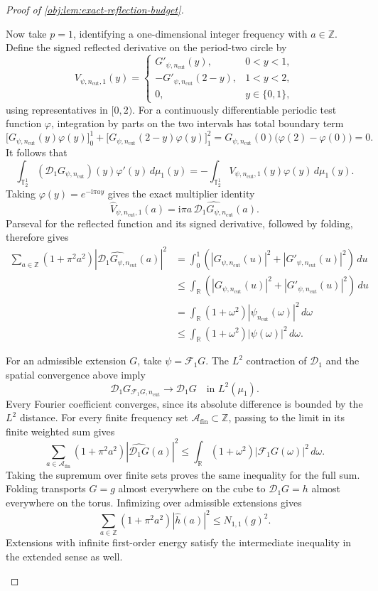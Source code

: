 \begin{proof}[Proof of \cref{obj:lem:exact-reflection-budget}]
\begin{enumerate}
Now take \(p=1\), identifying a one-dimensional integer frequency with \(a\in\mathbb Z\). Define the signed reflected derivative on the period-two circle by
\[
V_{\psi,n_{\mathrm{cut}},1}(y)
=
\begin{cases}
G'_{\psi,n_{\mathrm{cut}}}(y),&0<y<1,\\
-G'_{\psi,n_{\mathrm{cut}}}(2-y),&1<y<2,\\
0,&y\in\{0,1\},
\end{cases}
\]
using representatives in \([0,2)\). For a continuously differentiable periodic test function \(\varphi\), integration by parts on the two intervals has total boundary term
\[
\bigl[G_{\psi,n_{\mathrm{cut}}}(y)\varphi(y)\bigr]_0^1
+
\bigl[G_{\psi,n_{\mathrm{cut}}}(2-y)\varphi(y)\bigr]_1^2
=
G_{\psi,n_{\mathrm{cut}}}(0)\bigl(\varphi(2)-\varphi(0)\bigr)
=
0.
\]
It follows that
\[
\int_{\mathbb T_2^1}
(\mathscr D_1G_{\psi,n_{\mathrm{cut}}})(y)\varphi'(y)\,d\mu_1(y)
=
-\int_{\mathbb T_2^1}
V_{\psi,n_{\mathrm{cut}},1}(y)\varphi(y)\,d\mu_1(y).
\]
Taking \(\varphi(y)=e^{-\mathrm i\pi ay}\) gives the exact multiplier identity
\[
\widehat V_{\psi,n_{\mathrm{cut}},1}(a)
=
\mathrm i\pi a\,
\widehat{\mathscr D_1G_{\psi,n_{\mathrm{cut}}}}(a).
\]
Parseval for the reflected function and its signed derivative, followed by folding, therefore gives
\[
\begin{aligned}
\sum_{a\in\mathbb Z}(1+\pi^2a^2)
\left|\widehat{\mathscr D_1G_{\psi,n_{\mathrm{cut}}}}(a)\right|^2
&=
\int_0^1
\left(
|G_{\psi,n_{\mathrm{cut}}}(u)|^2+
|G'_{\psi,n_{\mathrm{cut}}}(u)|^2
\right)\,du\\
&\leq
\int_{\mathbb R}
\left(
|G_{\psi,n_{\mathrm{cut}}}(u)|^2+
|G'_{\psi,n_{\mathrm{cut}}}(u)|^2
\right)\,du\\
&=
\int_{\mathbb R}(1+\omega^2)
|\psi_{n_{\mathrm{cut}}}(\omega)|^2\,d\omega\\
&\leq
\int_{\mathbb R}(1+\omega^2)|\psi(\omega)|^2\,d\omega.
\end{aligned}
\]

For an admissible extension \(G\), take \(\psi=\mathcal F_1G\).
The \(L^2\) contraction of \(\mathscr D_1\) and the spatial convergence above imply
\[
\mathscr D_1G_{\mathcal F_1G,n_{\mathrm{cut}}}
\longrightarrow\mathscr D_1G
\quad\text{in }L^2(\mu_1).
\]
Every Fourier coefficient converges, since its absolute difference is bounded by the \(L^2\) distance. For every finite frequency set \(\mathcal A_{\mathrm{fin}}\subset\mathbb Z\), passing to the limit in its finite weighted sum gives
\[
\sum_{a\in\mathcal A_{\mathrm{fin}}}(1+\pi^2a^2)
|\widehat{\mathscr D_1G}(a)|^2
\leq
\int_{\mathbb R}(1+\omega^2)|\mathcal F_1G(\omega)|^2\,d\omega.
\]
Taking the supremum over finite sets proves the same inequality for the full sum. Folding transports \(G=g\) almost everywhere on the cube to
\(\mathscr D_1G=h\) almost everywhere on the torus. Infimizing over admissible extensions gives
\[
\sum_{a\in\mathbb Z}(1+\pi^2a^2)|\widehat h(a)|^2
\leq N_{1,1}(g)^2.
\]
Extensions with infinite first-order energy satisfy the intermediate inequality in the extended sense as well.


\end{enumerate}
\end{proof}
